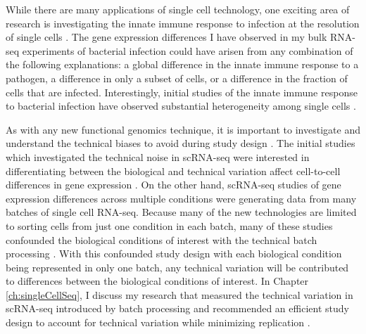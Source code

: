 While there are many applications of single cell technology, one
exciting area of research is investigating the innate immune response
to infection at the resolution of single cells \citep{Satija2014,
 Proserpio2016}. The gene expression differences I have observed in
my bulk RNA-seq experiments of bacterial infection could have arisen
from any combination of the following explanations: a global
difference in the innate immune response to a pathogen, a difference
in only a subset of cells, or a difference in the fraction of cells
that are infected. Interestingly, initial studies of the innate immune
response to bacterial infection have observed substantial
heterogeneity among single cells \citep{Shalek2013, Shalek2014, Avraham2015}.

As with any new functional genomics technique, it is important to
investigate and understand the technical biases to avoid during study
design \citep{Auer2010, Leek2010, Gilad2015}. The initial studies which investigated the technical noise in
scRNA-seq were interested in differentiating between the biological
and technical variation affect cell-to-cell differences in gene
expression \citep{Brennecke2013, Grun2014, Islam2014, Ding2015, Vallejos2015}.
On the other hand, scRNA-seq studies of gene expression
differences across multiple conditions were generating data from many
batches of single cell RNA-seq. Because many of the new technologies
are limited to sorting cells from just one condition in each batch,
many of these studies confounded the biological conditions of interest
with the technical batch processing \citep{Hicks2015}. With this
confounded study design with each biological condition being
represented in only one batch, any technical variation will be
contributed to differences between the biological conditions of
interest. In Chapter \ref{ch:singleCellSeq}, I discuss my research
that measured the technical variation in scRNA-seq introduced by batch
processing and recommended an efficient study design to account for
technical variation while minimizing replication \citep{Tung2016}.
